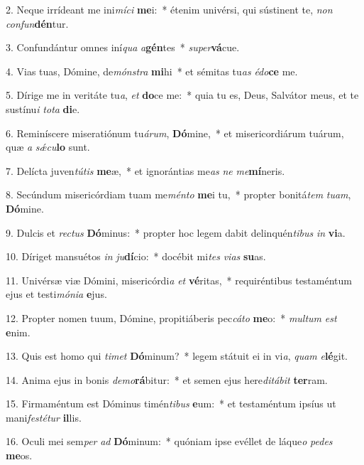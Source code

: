 2. Neque irrídeant me ini\textit{mí}\textit{ci} \textbf{me}i:~*  étenim univérsi, qui sústinent te, \textit{non} \textit{con}\textit{fun}\textbf{dén}tur.\

3. Confundántur omnes iní\textit{qua} \textit{a}\textbf{gén}tes~*  \textit{su}\textit{per}\textbf{vá}cue.\

4. Vias tuas, Dómine, de\textit{móns}\textit{tra} \textbf{mi}hi~*  et sémitas tu\textit{as} \textit{é}\textit{do}\textbf{ce} me.\

5. Dírige me in veritáte tu\textit{a}, \textit{et} \textbf{do}ce me:~*  quia tu es, Deus, Salvátor meus, et te sustínu\textit{i} \textit{to}\textit{ta} \textbf{di}e.\

6. Reminíscere miseratiónum tu\textit{á}\textit{rum}, \textbf{Dó}mine,~*  et misericordiárum tuárum, quæ \textit{a} \textit{sǽ}\textit{cu}\textbf{lo} sunt.\

7. Delícta juven\textit{tú}\textit{tis} \textbf{me}æ,~*  et ignorántias me\textit{as} \textit{ne} \textit{me}\textbf{mí}neris.\

8. Secúndum misericórdiam tuam me\textit{mén}\textit{to} \textbf{me}i tu,~*  propter bonitá\textit{tem} \textit{tu}\textit{am}, \textbf{Dó}mine.\

9. Dulcis et \textit{rec}\textit{tus} \textbf{Dó}minus:~*  propter hoc legem dabit delinquén\textit{ti}\textit{bus} \textit{in} \textbf{vi}a.\

10. Díriget mansuétos \textit{in} \textit{ju}\textbf{dí}cio:~*  docébit mi\textit{tes} \textit{vi}\textit{as} \textbf{su}as.\

11. Univérsæ viæ Dómini, misericórdi\textit{a} \textit{et} \textbf{vé}ritas,~*  requiréntibus testaméntum ejus et testi\textit{mó}\textit{ni}\textit{a} \textbf{e}jus.\

12. Propter nomen tuum, Dómine, propitiáberis pec\textit{cá}\textit{to} \textbf{me}o:~*  \textit{mul}\textit{tum} \textit{est} \textbf{e}nim.\

13. Quis est homo qui \textit{ti}\textit{met} \textbf{Dó}minum?~*  legem státuit ei in vi\textit{a}, \textit{quam} \textit{e}\textbf{lé}git.\

14. Anima ejus in bonis \textit{de}\textit{mo}\textbf{rá}bitur:~*  et semen ejus here\textit{di}\textit{tá}\textit{bit} \textbf{ter}ram.\

15. Firmaméntum est Dóminus timén\textit{ti}\textit{bus} \textbf{e}um:~*  et testaméntum ipsíus ut mani\textit{fes}\textit{té}\textit{tur} \textbf{il}lis.\

16. Oculi mei sem\textit{per} \textit{ad} \textbf{Dó}minum:~*  quóniam ipse evéllet de láque\textit{o} \textit{pe}\textit{des} \textbf{me}os.\

